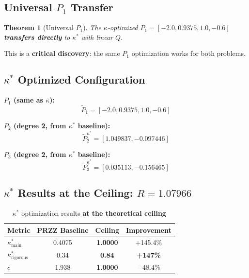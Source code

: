 \documentclass[11pt]{article}
\newtheorem{theorem}{Theorem}
\begin{document}
\subsection{Universal $P_1$ Transfer}

\begin{theorem}[Universal $P_1$]
The $\kappa$-optimized $P_1 = [-2.0, 0.9375, 1.0, -0.6]$ \textbf{transfers directly} to $\kappa^*$ with linear $Q$.
\end{theorem}

This is a \textbf{critical discovery}: the same $P_1$ optimization works for both problems.

\subsection{$\kappa^*$ Optimized Configuration}

\textbf{$P_1$ (same as $\kappa$):}
\begin{equation}
\tilde{P}_1 = [-2.0, 0.9375, 1.0, -0.6]
\end{equation}

\textbf{$P_2$ (degree 2, from $\kappa^*$ baseline):}
\begin{equation}
\tilde{P}_2^{\kappa^*} = [1.049837, -0.097446]
\end{equation}

\textbf{$P_3$ (degree 2, from $\kappa^*$ baseline):}
\begin{equation}
\tilde{P}_3^{\kappa^*} = [0.035113, -0.156465]
\end{equation}

\subsection{$\kappa^*$ Results at the Ceiling: $R = 1.07966$}

\begin{table}[h]
\centering
\caption{$\kappa^*$ optimization results \textbf{at the theoretical ceiling}}
\begin{tabular}{lccc}
\toprule
Metric & PRZZ Baseline & \textbf{Ceiling} & Improvement \\
\midrule
$\kappa^*_{\text{main}}$ & 0.4075 & \textbf{1.0000} & +145.4\% \\
$\kappa^*_{\text{rigorous}}$ & 0.34 & \textbf{0.84} & \textbf{+147\%} \\
$c$ & 1.938 & \textbf{1.0000} & $-48.4\%$ \\
\bottomrule
\end{tabular}
\end{table}
\end{document}
